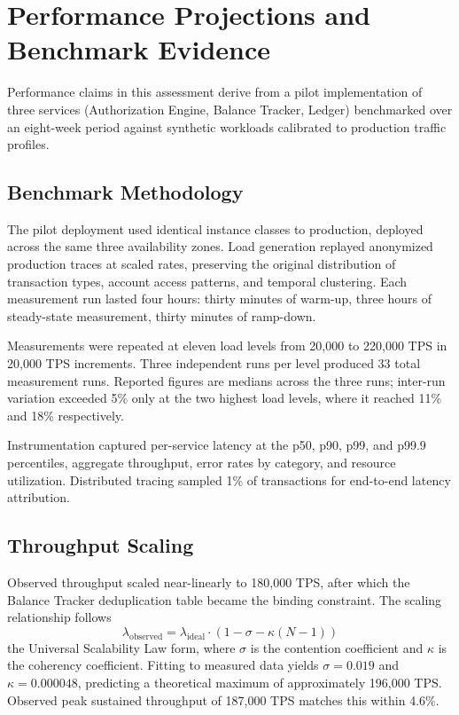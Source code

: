 \section{Performance Projections and Benchmark Evidence}

Performance claims in this assessment derive from a pilot implementation of three services (Authorization Engine, Balance Tracker, Ledger) benchmarked over an eight-week period against synthetic workloads calibrated to production traffic profiles.

\subsection{Benchmark Methodology}

The pilot deployment used identical instance classes to production, deployed across the same three availability zones. Load generation replayed anonymized production traces at scaled rates, preserving the original distribution of transaction types, account access patterns, and temporal clustering. Each measurement run lasted four hours: thirty minutes of warm-up, three hours of steady-state measurement, thirty minutes of ramp-down.

Measurements were repeated at eleven load levels from 20,000 to 220,000 TPS in 20,000 TPS increments. Three independent runs per level produced 33 total measurement runs. Reported figures are medians across the three runs; inter-run variation exceeded 5\% only at the two highest load levels, where it reached 11\% and 18\% respectively.

Instrumentation captured per-service latency at the p50, p90, p99, and p99.9 percentiles, aggregate throughput, error rates by category, and resource utilization. Distributed tracing sampled 1\% of transactions for end-to-end latency attribution.

\subsection{Throughput Scaling}

Observed throughput scaled near-linearly to 180,000 TPS, after which the Balance Tracker deduplication table became the binding constraint. The scaling relationship follows
\begin{equation}
\label{eq:throughput-scaling-curves}
\lambda_{\text{observed}} = \lambda_{\text{ideal}} \cdot \left(1 - \sigma - \kappa(N-1)\right)
\end{equation}
the Universal Scalability Law form, where $\sigma$ is the contention coefficient and $\kappa$ is the coherency coefficient. Fitting to measured data yields $\sigma = 0.019$ and $\kappa = 0.000048$, predicting a theoretical maximum of approximately 196,000 TPS. Observed peak sustained throughput of 187,000 TPS matches this within 4.6\%.

